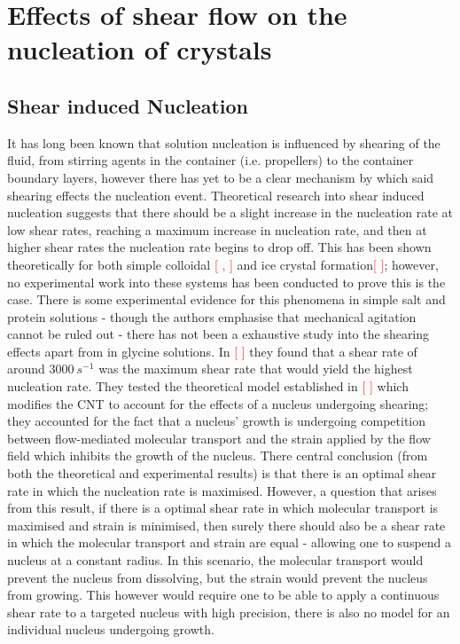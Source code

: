 \documentclass[a4paper,oneside,11pt]{book}
\begin{document}
\chapter{Effects of shear flow on the nucleation of crystals}
\section{Shear induced Nucleation}
It has long been known that solution nucleation is influenced by shearing of the fluid, from stirring agents in the container (i.e. propellers) to the container boundary layers, however there has yet to be a clear mechanism by which said shearing effects the nucleation event. Theoretical research into shear induced nucleation suggests that there should be a slight increase in the nucleation rate at low shear rates, reaching a maximum increase in nucleation rate, and then at higher shear rates the nucleation rate begins to drop off. This has been shown theoretically for both simple colloidal \textcolor{red}{[ , ]}  and ice crystal formation\textcolor{red}{[ ]}; however, no experimental work into these systems has been conducted to prove this is the case.  There is some experimental evidence for this phenomena in simple salt and protein solutions - though the authors emphasise that mechanical agitation cannot be ruled out - there has not been a exhaustive study into the shearing effects apart from in glycine solutions. In \textcolor{red}{[ ]} they found that a shear rate of around $3000\ s^{-1}$ was the maximum shear rate that would yield the highest nucleation rate. They tested the theoretical model established in \textcolor{red}{[ ]} which modifies the CNT to account for the effects of a nucleus undergoing shearing; they accounted for the fact that a nucleus' growth is undergoing competition between flow-mediated molecular transport and the strain applied by the flow field which inhibits the growth of the nucleus. There central conclusion (from both the theoretical and experimental results) is that there is an optimal shear rate in which the nucleation rate is maximised. However, a question that arises from this result, if there is a optimal shear rate in which molecular transport is maximised and strain is minimised, then surely there should also be a shear rate in which the molecular transport and strain are equal - allowing one to suspend a nucleus at a constant radius. In this scenario, the molecular transport would prevent the nucleus from dissolving, but the strain would prevent the nucleus from growing. This however would require one to be able to apply a continuous shear rate to a targeted nucleus with high precision, there is also no model for an individual nucleus undergoing growth. 
\end{document}
